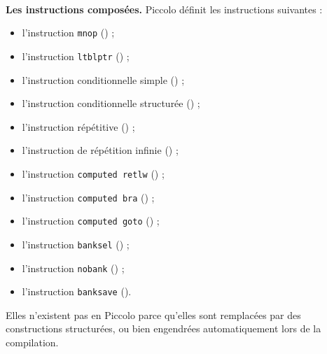 ~\\
\textbf{Les instructions composées.} Piccolo définit les instructions suivantes :
\begin{itemize}
  \item l'instruction \texttt{mnop} () ;
  \item l'instruction \texttt{ltblptr} () ;
  \item l'instruction conditionnelle simple () ;
  \item l'instruction conditionnelle structurée () ;
  \item l'instruction répétitive () ;
  \item l'instruction de répétition infinie () ;
  \item l'instruction \texttt{computed retlw} () ;
  \item l'instruction \texttt{computed bra} () ;
  \item l'instruction \texttt{computed goto} () ;
  \item l'instruction \texttt{banksel} () ;
  \item l'instruction \texttt{nobank} () ;
  \item l'instruction \texttt{banksave} ().
\end{itemize}





Elles n’existent pas en Piccolo parce qu’elles sont remplacées par des constructions structurées, ou bien engendrées automatiquement lors de la compilation.

